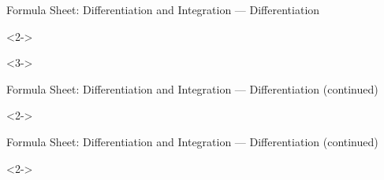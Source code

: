 \def\EMtitlesize{26}\def\EMtitleskip{31}
\begin{frame}{Formula Sheet: Differentiation and Integration — Differentiation}
\begin{uncoverenv}<2->
\vspace{3bp}
\vspace{3bp}
\vspace{3bp}
\vspace{3bp}
\end{uncoverenv}
\EMgap
\begin{uncoverenv}<3->
\vspace{3bp}
\vspace{3bp}
\vspace{3bp}
\end{uncoverenv}
\end{frame}

\def\EMtitlesize{26}\def\EMtitleskip{31}
\begin{frame}{Formula Sheet: Differentiation and Integration — Differentiation (continued)}
\begin{uncoverenv}<2->
\vspace{3bp}
\vspace{3bp}
\vspace{3bp}
\vspace{3bp}
\vspace{3bp}
\vspace{3bp}
\vspace{3bp}
\vspace{3bp}
\end{uncoverenv}
\end{frame}

\def\EMtitlesize{26}\def\EMtitleskip{31}
\begin{frame}{Formula Sheet: Differentiation and Integration — Differentiation (continued)}
\begin{uncoverenv}<2->
\vspace{3bp}
\vspace{3bp}
\end{uncoverenv}
\end{frame}

